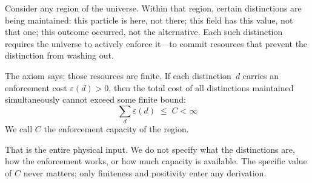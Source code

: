 \documentclass[11pt]{article}
\begin{document}
Consider any region of the universe.  Within that region, certain distinctions are being maintained: this particle is here, not there; this field has this value, not that one; this outcome occurred, not the alternative.  Each such distinction requires the universe to actively enforce it---to commit resources that prevent the distinction from washing out.

The axiom says: those resources are finite.  If each distinction~$d$ carries an enforcement cost $\varepsilon(d) > 0$, then the total cost of all distinctions maintained simultaneously cannot exceed some finite bound:
\begin{equation}
\sum_d \varepsilon(d) \;\le\; C < \infty
\end{equation}
We call $C$ the enforcement capacity of the region.

That is the entire physical input.  We do not specify what the distinctions are, how the enforcement works, or how much capacity is available.  The specific value of $C$ never matters; only finiteness and positivity enter any derivation.
\end{document}
